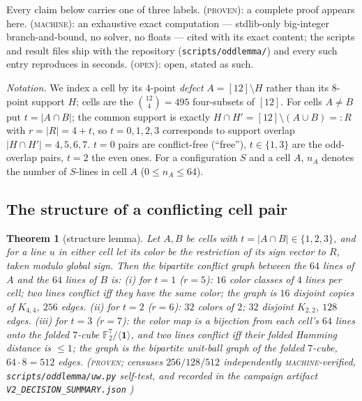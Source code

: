 \documentclass[11pt]{article}
\newtheorem{theorem}{Theorem}
\theoremstyle{remark}
\begin{document}
Every claim below carries one of three labels. \textsc{(proven)}: a
complete proof appears here. \textsc{(machine)}: an exhaustive exact
computation --- stdlib-only big-integer branch-and-bound, no solver, no
floats --- cited with its exact content; the scripts and result files ship
with the repository (\texttt{scripts/oddlemma/}) and every such entry
reproduces in seconds. \textsc{(open)}: open, stated as such.

\emph{Notation.} We index a cell by its $4$-point \emph{defect}
$A=[12]\setminus H$ rather than its $8$-point support $H$; cells are the
$\binom{12}{4}=495$ four-subsets of $[12]$. For cells $A\ne B$ put
$t=|A\cap B|$; the common support is exactly
$H\cap H'=[12]\setminus(A\cup B)=:R$ with $r=|R|=4+t$, so $t=0,1,2,3$
corresponds to support overlap $|H\cap H'|=4,5,6,7$. $t=0$ pairs are
conflict-free (``free''), $t\in\{1,3\}$ are the odd-overlap pairs, $t=2$
the even ones. For a configuration $S$ and a cell $A$, $n_A$ denotes the
number of $S$-lines in cell $A$ ($0\le n_A\le 64$).

\subsection{The structure of a conflicting cell pair}

\begin{theorem}[structure lemma]\label{thm:structure}
Let $A,B$ be cells with $t=|A\cap B|\in\{1,2,3\}$, and for a line $u$ in
either cell let its \emph{color} be the restriction of its sign vector to
$R$, taken modulo global sign. Then the bipartite conflict graph between
the $64$ lines of $A$ and the $64$ lines of $B$ is: \textup{(i)} for $t=1$
($r=5$): $16$ color classes of $4$ lines per cell; two lines conflict iff
they have the same color; the graph is $16$ disjoint copies of $K_{4,4}$,
$256$ edges. \textup{(ii)} for $t=2$ ($r=6$): $32$ colors of $2$; $32$
disjoint $K_{2,2}$, $128$ edges. \textup{(iii)} for $t=3$ ($r=7$): the
color map is a bijection from each cell's $64$ lines onto the folded
$7$-cube $\mathbb{F}_2^7/\langle\mathbf 1\rangle$, and two lines conflict
iff their folded Hamming distance is $\le 1$; the graph is the bipartite
unit-ball graph of the folded $7$-cube, $64\cdot 8=512$ edges.
\textsc{(proven}; censuses $256/128/512$ independently
\textsc{machine}-verified, \texttt{scripts/oddlemma/uw.py} self-test, and
recorded in the campaign artifact \texttt{V2\_DECISION\_SUMMARY.json}%
\textsc{)}
\end{theorem}
\end{document}
